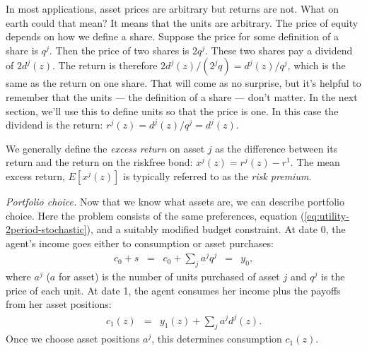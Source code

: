\documentclass[11pt]{article}
\begin{document}
In most applications, asset prices are arbitrary but returns are not.
What on earth could that mean?
It means that the units are arbitrary.
The price of equity depends on how we define a share.
Suppose the price for some definition of a share is $q^j$.
Then the price of two shares is $2q^j$.
These two shares pay a dividend of $2 d^j(z)$.
The return is therefore $ 2d^j(z)/(2^jq) = d^j(z)/q^j$,
which is the same as the return on one share.
That will come as no surprise, but it's helpful to remember
that the units --- the definition of a share --- don't matter.
In the next section, we'll use this to define
units so that the price is one.
In this case the dividend is the return:  $r^j(z) = d^j(z)/q^j = d^j(z)$.

We generally define the {\it excess return\/} on asset $j$ as the difference
between its return and the return on the riskfree bond:
$ x^j(z) = r^j(z) - r^1 $. 
The mean excess return, $ E[x^j(z)]$ is typically referred
to as the {\it risk premium\/}.


{\it Portfolio choice.\/} 
Now that we know what assets are, we can describe portfolio choice.
Here the problem consists of the same preferences,
equation (\ref{eq:utility-2period-stochastic}),
and a suitably modified budget constraint.
At date 0, the agent's income goes either to consumption
or asset purchases:
\begin{eqnarray}
    c_0 + s \;\;=\;\; c_0 + \sum_j a^j q^j &=& y_0 ,
    \label{eq:budget-2period-c0}
\end{eqnarray}
where $a^j$ ($a$ for asset) is the number of units
purchased of asset $j$ and $q^j$ is the price of each unit.
At date 1, the agent consumes her income
plus the payoffs from her asset positions:
\begin{eqnarray}
    c_1(z)  &=& y_1(z) + \sum_j a^j d^j(z) .
    \label{eq:budget-2period-c1}
\end{eqnarray}
Once we choose asset positions $a^j$,
this determines consumption $c_1(z)$.
\end{document}
